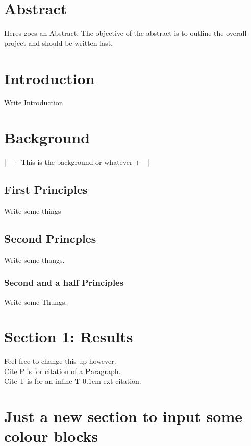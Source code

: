




\section*{Abstract}
Heres goes an Abstract. The objective of the abstract is to outline the overall project and should be written last.
\clearpage

\tableofcontents
\clearpage
{}
\section{Introduction}
Write Introduction


\section{Background}
|---+ This is the background or whatever +---|

\subsection{First Principles}
Write some things

\subsection{Second Princples}
Write some thangs.

\subsubsection{Second and a half Principles}
Write some Thungs.


\section{Section 1: Results}
Feel free to change this up however. \\
\citep{harris2004} Cite P is for citation of a \textbf{P}aragraph.\\
\citet{harris2021} Cite T is for an inline \textbf{T}\kern -0.1em ext citation.

\section{Just a new section to input some colour blocks}

\clearpage

